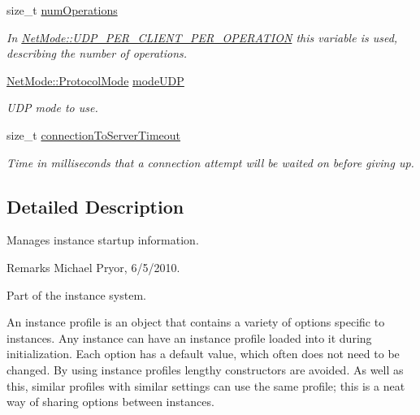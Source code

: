 \begin{DoxyCompactItemize}
size\_\-t \hyperlink{class_net_instance_profile_acfc20340749f35543345f8b6c00fef4a}{numOperations}
\begin{DoxyCompactList}\small\item\em In \hyperlink{class_net_mode_a43cfa55ee6a4db66a8d7d6c27f766964a947fd0828716fc0442ea546cce111c27}{NetMode::UDP\_\-PER\_\-CLIENT\_\-PER\_\-OPERATION} this variable is used, describing the number of operations. \item\end{DoxyCompactList}\item 
\hyperlink{class_net_mode_a43cfa55ee6a4db66a8d7d6c27f766964}{NetMode::ProtocolMode} \hyperlink{class_net_instance_profile_a6f7dcc6d649e11ab2f9c9cf99dd74313}{modeUDP}
\begin{DoxyCompactList}\small\item\em UDP mode to use. \item\end{DoxyCompactList}\item 
size\_\-t \hyperlink{class_net_instance_profile_aa9aa810da463cdab017ab864515527c9}{connectionToServerTimeout}
\begin{DoxyCompactList}\small\item\em Time in milliseconds that a connection attempt will be waited on before giving up. \item\end{DoxyCompactList}\end{DoxyCompactItemize}


\subsection{Detailed Description}
Manages instance startup information. \begin{DoxyRemark}{Remarks}
Michael Pryor, 6/5/2010.
\end{DoxyRemark}
Part of the instance system. \par
\par


An instance profile is an object that contains a variety of options specific to instances. Any instance can have an instance profile loaded into it during initialization. Each option has a default value, which often does not need to be changed. By using instance profiles lengthy constructors are avoided. As well as this, similar profiles with similar settings can use the same profile; this is a neat way of sharing options between instances.\par
\par


